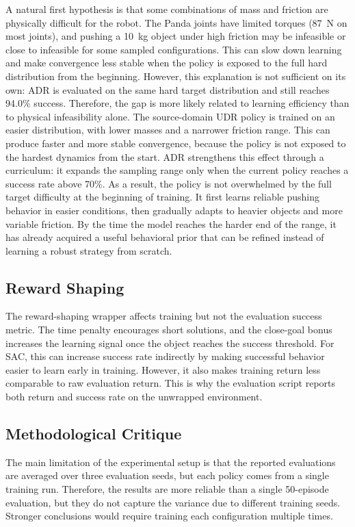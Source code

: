 A natural first hypothesis is that some combinations of mass and friction are physically difficult for the robot. The Panda joints have limited torques (87~N on most joints), and pushing a 10~kg object under high friction may be infeasible or close to infeasible for
some sampled configurations. This can slow down learning and make convergence less stable when the policy is exposed to the full hard distribution from the beginning. However, this explanation is not sufficient on its own: ADR is evaluated on the same hard target
distribution and still reaches 94.0\% success. Therefore, the gap is more likely related to learning efficiency than to physical infeasibility alone.
The source-domain UDR policy is trained on an easier distribution, with lower masses and a narrower friction range. This can produce faster and more stable convergence, because the policy is not exposed to the hardest dynamics from the start. ADR strengthens this
effect through a curriculum: it expands the sampling range only when the current policy reaches a success rate above 70\%. As a result, the policy is not overwhelmed by the full target difficulty at the beginning of training. It first learns reliable pushing behavior
in easier conditions, then gradually adapts to heavier objects and more variable friction. By the time the model reaches the harder end of the range, it has already acquired a useful behavioral prior that can be refined instead of learning a robust strategy from
scratch.

\subsection{Reward Shaping}
The reward-shaping wrapper affects training but not the evaluation success metric. The time penalty encourages short solutions, and the close-goal bonus increases the learning signal once the object reaches the success threshold. For SAC, this can increase success rate indirectly by making successful behavior easier to learn early in training. However, it also makes training return less comparable to raw evaluation return. This is why the evaluation script reports both return and success rate on the unwrapped environment.

\subsection{Methodological Critique}

The main limitation of the experimental setup is that the reported evaluations are averaged over three evaluation seeds, but each policy comes from a single training run. Therefore, the results are more reliable than a single 50-episode evaluation, but they do not
capture the variance due to different training seeds. Stronger conclusions would require training each configuration multiple times.

